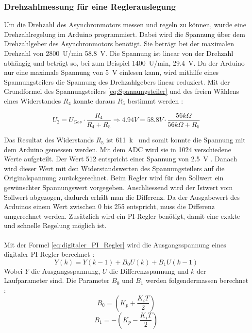 \subsubsection{Drehzahlmessung für eine Reglerauslegung}
Um die Drehzahl des Asynchronmotors messen und regeln zu können, wurde eine Drehzahlregelung im Arduino programmiert. Dabei wird die Spannung über dem Drehzahlgeber des Asynchronmotors benötigt. Sie beträgt bei der maximalen Drehzahl von \SI{2800}{U/min} \SI{58.8}{V}. Die Spannung ist linear von der Drehzahl abhängig und beträgt so, bei zum Beispiel \SI{1400}{U/min}, \SI{29.4}{V}. Da der Arduino nur eine maximale Spannung von \SI{5}{V} einlesen kann, wird mithilfe eines Spannungsteilers die Spannung des Drehzahlgebers linear reduziert. Mit der Grundformel des Spannungsteilers \ref{eq:Spannungsteiler} und des freien Wählens eines Widerstandes $R_4$ konnte daraus $R_5$ bestimmt werden \cite{Spannungsteiler}:

\begin{equation}\label{eq:Spannungsteiler}
U_2=U_{Ges} \cdot\frac{R_4}{R_4 + R_5} \Longrightarrow 4.94 V = 58.8 V \cdot \frac{56k\Omega}{56k\Omega + R_5}
\end{equation}

Das Resultat des Widerstands $R_5$ ist \SI{611}{k\Omega} und somit konnte die Spannung mit dem Arduino gemessen werden. Mit dem ADC wird sie in 1024 verschiedene Werte aufgeteilt. Der Wert 512 entspricht  einer Spannung von \SI{2.5}{V} \cite{Spannungsmessung}. Danach wird dieser Wert mit den Widerstandswerten des Spannungsteilers auf die Originalspannung zurückgerechnet. Beim Regler wird für den Sollwert ein gewünschter Spannungswert vorgegeben. Anschliessend wird der Istwert vom Sollwert abgezogen, dadurch erhält man die Differenz. Da der Ausgabewert des Arduinos einem Wert zwischen 0 bis 255 entspricht, muss die Differenz umgerechnet werden. Zusätzlich wird ein PI-Regler benötigt, damit eine exakte und schnelle Regelung möglich ist.\\\\
Mit der Formel \ref{eq:digitaler_PI_Regler} wird die Ausgangsspannung eines digitaler PI-Regler berechnet \cite{Quelle_Marco} : 
\begin{equation}\label{eq:digitaler_PI_Regler}
Y(k) = Y(k-1)+ B_0U(k)+B_1U(k-1)
\end{equation}
Wobei $Y$ die Ausgangsspannung, $U$ die Differenzspannung und $k$ der Laufparameter sind. Die Parameter $B_0$ und $B_1$ werden folgendermassen berechnet \cite{PI_Regler}:
\begin{equation}\label{eq:B0}
B_0 = \left(K_p + \frac{K_iT}{2}\right) 
\end{equation}
\begin{equation}\label{eq:B1}
B_1 = -\left(K_p - \frac{K_iT}{2}\right) 
\end{equation}

